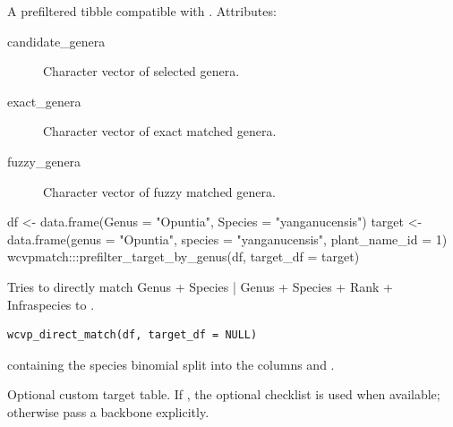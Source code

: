 \documentclass[a4paper]{book}
\begin{document}
%
\begin{Value}
A prefiltered  tibble compatible with .
Attributes:
\begin{description}

\item[candidate\_genera] Character vector of selected genera.
\item[exact\_genera] Character vector of exact matched genera.
\item[fuzzy\_genera] Character vector of fuzzy matched genera.

\end{description}

\end{Value}
%
\begin{Examples}
\begin{ExampleCode}

df <- data.frame(Genus = "Opuntia", Species = "yanganucensis")
target <- data.frame(genus = "Opuntia", species = "yanganucensis", plant_name_id = 1)
wcvpmatch:::prefilter_target_by_genus(df, target_df = target)

\end{ExampleCode}
\end{Examples}
%
\begin{Description}
\strong{[Stable]}

Tries to directly match Genus + Species | Genus + Species + Rank + Infraspecies to .
\end{Description}
%
\begin{Usage}
\begin{verbatim}
wcvp_direct_match(df, target_df = NULL)
\end{verbatim}
\end{Usage}
%
\begin{Arguments}
\begin{ldescription}
\item[\code{df}]  containing the species binomial split into the columns  and .

\item[\code{target\_df}] Optional custom target table. If , the optional  checklist is used when available; otherwise pass a backbone explicitly.
\end{ldescription}
\end{Arguments}
\end{document}
